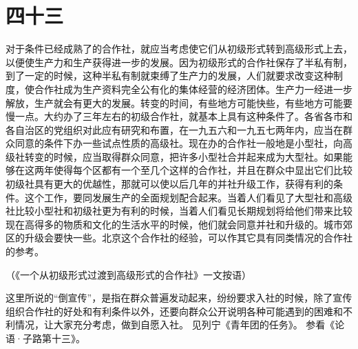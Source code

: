 \section*{四十三}

对于条件已经成熟了的合作社，就应当考虑使它们从初级形式转到高级形式上去，以便使生产力和生产获得进一步的发展。因为初级形式的合作社保存了半私有制，到了一定的时候，这种半私有制就束缚了生产力的发展，人们就要求改变这种制度，使合作社成为生产资料完全公有化的集体经营的经济团体。生产力一经进一步解放，生产就会有更大的发展。转变的时间，有些地方可能快些，有些地方可能要慢一点。大约办了三年左右的初级合作社，就基本上具有这种条件了。各省各市和各自治区的党组织对此应有研究和布置，在一九五六和一九五七两年内，应当在群众同意的条件下办一些试点性质的高级社。现在办的合作社一般地是小型社，向高级社转变的时候，应当取得群众同意，把许多小型社合并起来成为大型社。如果能够在这两年使得每个区都有一个至几个这样的合作社，并且在群众中显出它们比较初级社具有更大的优越性，那就可以使以后几年的并社升级工作，获得有利的条件。这个工作，要同发展生产的全面规划配合起来。当着人们看见了大型社和高级社比较小型社和初级社更为有利的时候，当着人们看见长期规划将给他们带来比较现在高得多的物质和文化的生活水平的时候，他们就会同意并社和升级的。城市郊区的升级会要快一些。北京这个合作社的经验，可以作其它具有同类情况的合作社的参考。


（《一个从初级形式过渡到高级形式的合作社》一文按语）


\begin{maonote}
这里所说的“倒宣传”，是指在群众普遍发动起来，纷纷要求入社的时候，除了宣传组织合作社的好处和有利条件以外，还要向群众公开说明各种可能遇到的困难和不利情况，让大家充分考虑，做到自愿入社。
见列宁《青年团的任务》。
参看《论语·子路第十三》。
\end{maonote}
